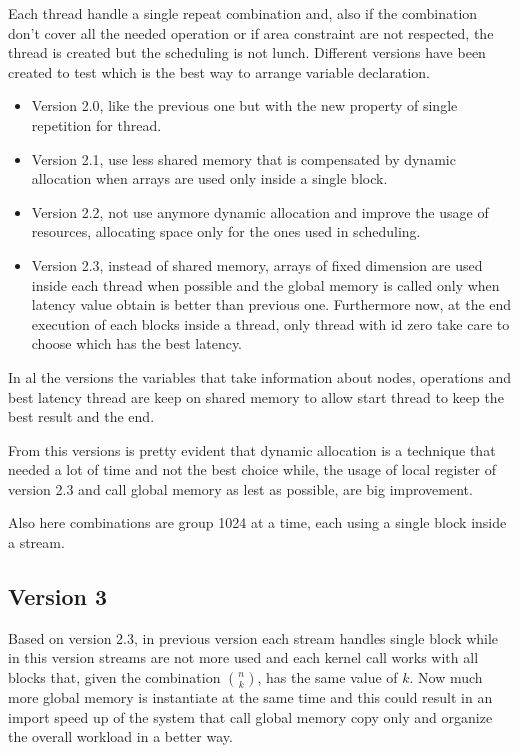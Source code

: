 Each thread handle a single repeat combination and, also if the combination don't cover all the needed operation or
if area constraint are not respected, the thread is created but the scheduling is not lunch.
Different versions have been created to test which is the best way to arrange variable declaration.

\begin{itemize}
    \item Version 2.0, like the previous one but with the new property of single repetition for thread.
    
    \item Version 2.1, use less shared memory that is compensated by dynamic allocation when arrays are used only inside a 
    single block.
    
    \item Version 2.2, not use anymore dynamic allocation and improve the usage of resources,
    allocating space only for the ones used in scheduling.
    
    \item Version 2.3, instead of shared memory, arrays of fixed dimension are used inside each thread when possible and the 
    global memory is called only when latency value obtain is better than previous one. Furthermore now, at the end execution of 
    each blocks inside a thread, only thread with id zero take care to choose which has the best latency. 
\end{itemize}

In al the versions the variables that take information about nodes, operations and best latency thread are keep on shared memory 
to allow start thread to keep the best result and the end.

From this versions is pretty evident that dynamic allocation is a technique that needed a lot of time and
not the best choice while, the usage of local register of version 2.3 and call global memory as lest as possible, 
are big improvement.

Also here combinations are group 1024 at a time, each using a single block inside a stream.

\subsection{Version 3}

Based on version 2.3, in previous version each stream handles single block while in this version streams are not more used 
and each kernel call works with all blocks that, given the combination $\binom{n}{k}$, has the same value of $k$.
Now much more global memory is instantiate at the same time and this could result in an import speed up of the system that
call global memory copy only and organize the overall workload in a better way.

